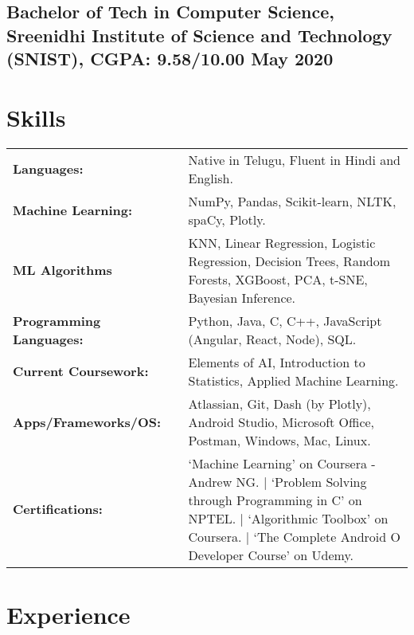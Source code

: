 \documentclass[a4,10pt]{article}
\newcommand{\hskills}[1]{
\textbf{\bfseries #1} }
\begin{document}
\subsection*{Bachelor of Tech in Computer Science, {\normalsize \normalfont Sreenidhi Institute of Science and Technology (SNIST), CGPA: 9.58/10.00} \hfill May 2020} 
\vspace{0.2cm}



\section{Skills}
\begin{tabular}{p{11em} p{1em} p{43em}}
\hskills{Languages:} &  & Native in Telugu, Fluent in Hindi and English. \\
\hskills{Machine Learning:} &  & NumPy, Pandas, Scikit-learn, NLTK, spaCy, Plotly. \\
\hskills{ML Algorithms} &  & KNN, Linear Regression, Logistic Regression, Decision Trees, Random Forests, XGBoost, PCA, t-SNE, Bayesian Inference. \\
\hskills{Programming Languages:}&  &  Python, Java, C, C++, JavaScript (Angular, React, Node), SQL.  \\
\hskills{Current Coursework:} &  &  Elements of AI, Introduction to Statistics, Applied Machine Learning.  \\
\hskills{Apps/Frameworks/OS:} &  & Atlassian, Git, Dash (by Plotly), Android Studio, Microsoft Office, Postman, Windows, Mac, Linux.   \\
\hskills{Certifications:} &  & ‘Machine Learning’ on Coursera - Andrew NG. | ‘Problem Solving through Programming in C’ on NPTEL. | ‘Algorithmic Toolbox’ on Coursera. | ‘The Complete Android O Developer Course’ on Udemy. \\
\end{tabular}
\vspace{-0.2cm}




\section{Experience}
\end{document}
